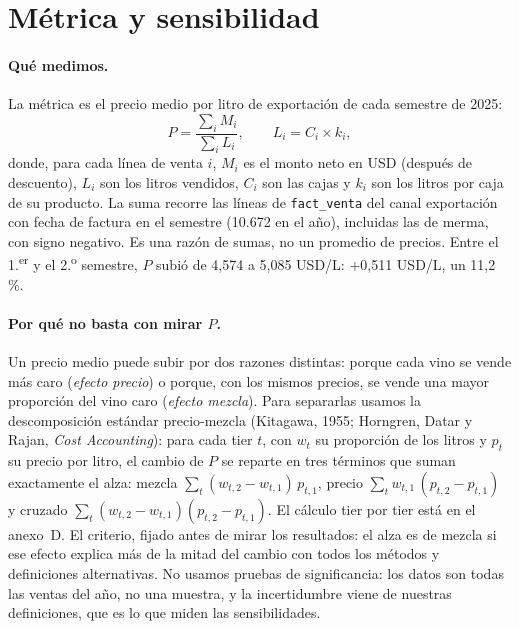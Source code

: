 
\section{Métrica y sensibilidad}
\label{sec:metrica}

\paragraph{Qué medimos.} La métrica es el precio medio por litro de exportación de cada semestre de 2025:
\[
P = \frac{\sum_i M_i}{\sum_i L_i}, \qquad L_i = C_i \times k_i,
\]
donde, para cada línea de venta $i$, $M_i$ es el monto neto en USD (después de descuento), $L_i$ son los litros vendidos, $C_i$ son las cajas y $k_i$ son los litros por caja de su producto. La suma recorre las líneas de \texttt{fact\_venta} del canal exportación con fecha de factura en el semestre (10.672 en el año), incluidas las de merma, con signo negativo. Es una razón de sumas, no un promedio de precios. Entre el 1.\textsuperscript{er} y el 2.\textsuperscript{o} semestre, $P$ subió de 4,574 a 5,085 USD/L: +0,511 USD/L, un 11,2\,\%.

\paragraph{Por qué no basta con mirar $P$.} Un precio medio puede subir por dos razones distintas: porque cada vino se vende más caro (\emph{efecto precio}) o porque, con los mismos precios, se vende una mayor proporción del vino caro (\emph{efecto mezcla}). Para separarlas usamos la descomposición estándar precio-mezcla (Kitagawa, 1955; Horngren, Datar y Rajan, \emph{Cost Accounting}): para cada tier $t$, con $w_t$ su proporción de los litros y $p_t$ su precio por litro, el cambio de $P$ se reparte en tres términos que suman exactamente el alza: mezcla $\sum_t (w_{t,2}-w_{t,1})\,p_{t,1}$, precio $\sum_t w_{t,1}\,(p_{t,2}-p_{t,1})$ y cruzado $\sum_t (w_{t,2}-w_{t,1})(p_{t,2}-p_{t,1})$. El cálculo tier por tier está en el anexo~D. El criterio, fijado antes de mirar los resultados: el alza es de mezcla si ese efecto explica más de la mitad del cambio con todos los métodos y definiciones alternativas. No usamos pruebas de significancia: los datos son todas las ventas del año, no una muestra, y la incertidumbre viene de nuestras definiciones, que es lo que miden las sensibilidades.

